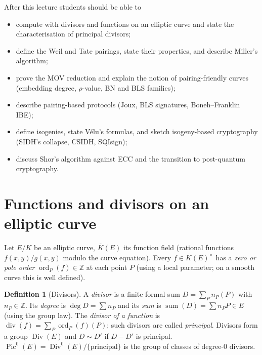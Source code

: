 \documentclass[11pt,a4paper,oneside]{book}
\theoremstyle{plain}
\theoremstyle{definition}
\newtheorem{definition}[theorem]{Definition}
\theoremstyle{remark}
\newcommand{\Z}{\mathbb{Z}}
\newcommand{\Kbar}{\overline{K}}
\newcommand{\Div}{\operatorname{Div}}
\newcommand{\Pic}{\operatorname{Pic}}
\newcommand{\divv}{\operatorname{div}}
\begin{document}
\begin{goalsbox}
After this lecture students should be able to
\begin{itemize}[nosep]
\item compute with divisors and functions on an elliptic curve and state the characterisation of principal divisors;
\item define the Weil and Tate pairings, state their properties, and describe Miller's algorithm;
\item prove the MOV reduction and explain the notion of pairing-friendly curves (embedding degree, $\rho$-value, BN and BLS families);
\item describe pairing-based protocols (Joux, BLS signatures, Boneh--Franklin IBE);
\item define isogenies, state V\'elu's formulas, and sketch isogeny-based cryptography (SIDH's collapse, CSIDH, SQIsign);
\item discuss Shor's algorithm against ECC and the transition to post-quantum cryptography.
\end{itemize}
\end{goalsbox}

\section{Functions and divisors on an elliptic curve}

Let $E/K$ be an elliptic curve, $\Kbar(E)$ its function field (rational functions $f(x,y)/g(x,y)$ modulo the curve equation). Every $f\in\Kbar(E)^\times$ has a \emph{zero or pole order} $\operatorname{ord}_P(f)\in\Z$ at each point $P$ (using a local parameter; on a smooth curve this is well defined).

\begin{definition}[Divisors]
A \emph{divisor} is a finite formal sum $D=\sum_Pn_P(P)$ with $n_P\in\Z$. Its \emph{degree} is $\deg D=\sum n_P$ and its \emph{sum} is $\operatorname{sum}(D)=\sum n_PP\in E$ (using the group law). The \emph{divisor of a function} is $\divv(f)=\sum_P\operatorname{ord}_P(f)(P)$; such divisors are called \emph{principal}. Divisors form a group $\Div(E)$ and $D\sim D'$ if $D-D'$ is principal. $\Pic^0(E)=\Div^0(E)/\{\text{principal}\}$ is the group of classes of degree-$0$ divisors.
\end{definition}
\end{document}
